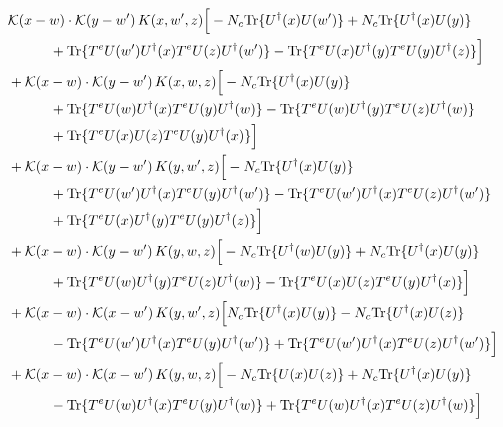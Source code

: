 \documentclass[10pt]{article}
\numberwithin{equation}{section}
\begin{document}
\begin{align}
&\mathcal K(x-w)\cdot\mathcal K(y-w')\,K(x,w',z)\Big[-N_c{\rm Tr}\{U^\dagger(x)U(w')\}+N_c{\rm Tr}\{U^\dagger(x)U(y)\}\notag\\
&\quad\quad\quad+{\rm Tr}\{T^eU(w')U^\dagger(x)T^eU(z)U^\dagger(w')\}-{\rm Tr}\{T^eU(x)U^\dagger(y)T^eU(y)U^\dagger(z)\}\Big]\notag\\
&+\mathcal K(x-w)\cdot\mathcal K(y-w')\,K(x,w,z)\Big[-N_c{\rm Tr}\{U^\dagger(x)U(y)\}\notag\\
&\quad\quad\quad+{\rm Tr}\{T^eU(w)U^\dagger(x)T^eU(y)U^\dagger(w)\}-{\rm Tr}\{T^eU(w)U^\dagger(y)T^eU(z)U^\dagger(w)\}\notag\\
&\quad\quad\quad+{\rm Tr}\{T^eU(x)U(z)T^eU(y)U^\dagger(x)\}\Big]\notag\\
&+\mathcal K(x-w)\cdot\mathcal K(y-w')\,K(y,w',z)\Big[-N_c{\rm Tr}\{U^\dagger(x)U(y)\}\notag\\
&\quad\quad\quad+{\rm Tr}\{T^eU(w')U^\dagger(x)T^eU(y)U^\dagger(w')\}-{\rm Tr}\{T^eU(w')U^\dagger(x)T^eU(z)U^\dagger(w')\}\notag\\
&\quad\quad\quad+{\rm Tr}\{T^eU(x)U^\dagger(y)T^eU(y)U^\dagger(z)\}\Big]\notag\\
&+\mathcal K(x-w)\cdot\mathcal K(y-w')\,K(y,w,z)\Big[-N_c{\rm Tr}\{U^\dagger(w)U(y)\}+N_c{\rm Tr}\{U^\dagger(x)U(y)\}\notag\\
&\quad\quad\quad+{\rm Tr}\{T^eU(w)U^\dagger(y)T^eU(z)U^\dagger(w)\}-{\rm Tr}\{T^eU(x)U(z)T^eU(y)U^\dagger(x)\}\Big]\notag\\
&+\mathcal K(x-w)\cdot\mathcal K(x-w')\,K(y,w',z)\Big[N_c{\rm Tr}\{U^\dagger(x)U(y)\}-N_c{\rm Tr}\{U^\dagger(x)U(z)\}\notag\\
&\quad\quad\quad-{\rm Tr}\{T^eU(w')U^\dagger(x)T^eU(y)U^\dagger(w')\}+{\rm Tr}\{T^eU(w')U^\dagger(x)T^eU(z)U^\dagger(w')\}\Big]\notag\\
&+\mathcal K(x-w)\cdot\mathcal K(x-w')\,K(y,w,z)\Big[-N_c{\rm Tr}\{U(x)U(z)\}+N_c{\rm Tr}\{U^\dagger(x)U(y)\}\notag\\
&\quad\quad\quad-{\rm Tr}\{T^eU(w)U^\dagger(x)T^eU(y)U^\dagger(w)\}+{\rm Tr}\{T^eU(w)U^\dagger(x)T^eU(z)U^\dagger(w)\}\Big]
\label{eq:list20}
\end{align}

\end{document}
